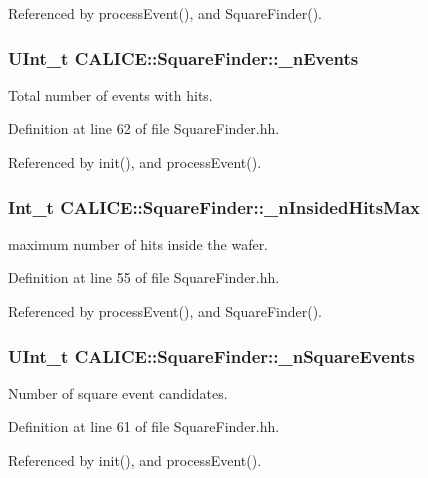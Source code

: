 Referenced by processEvent(), and SquareFinder().
\subsubsection[{\_\-nEvents}]{\setlength{\rightskip}{0pt plus 5cm}UInt\_\-t {\bf CALICE::SquareFinder::\_\-nEvents}\hspace{0.3cm}{\ttfamily  [protected]}}\label{classCALICE_1_1SquareFinder_a5110e34b92e02a21bf870ff104e59745}


Total number of events with hits. 

Definition at line 62 of file SquareFinder.hh.

Referenced by init(), and processEvent().
\subsubsection[{\_\-nInsidedHitsMax}]{\setlength{\rightskip}{0pt plus 5cm}Int\_\-t {\bf CALICE::SquareFinder::\_\-nInsidedHitsMax}\hspace{0.3cm}{\ttfamily  [protected]}}\label{classCALICE_1_1SquareFinder_ab81ff4d872972c06c2d072c9e681b321}


maximum number of hits inside the wafer. 

Definition at line 55 of file SquareFinder.hh.

Referenced by processEvent(), and SquareFinder().
\subsubsection[{\_\-nSquareEvents}]{\setlength{\rightskip}{0pt plus 5cm}UInt\_\-t {\bf CALICE::SquareFinder::\_\-nSquareEvents}\hspace{0.3cm}{\ttfamily  [protected]}}\label{classCALICE_1_1SquareFinder_a85c4e30fac259f17c8bbcb789b28d871}


Number of square event candidates. 

Definition at line 61 of file SquareFinder.hh.

Referenced by init(), and processEvent().
